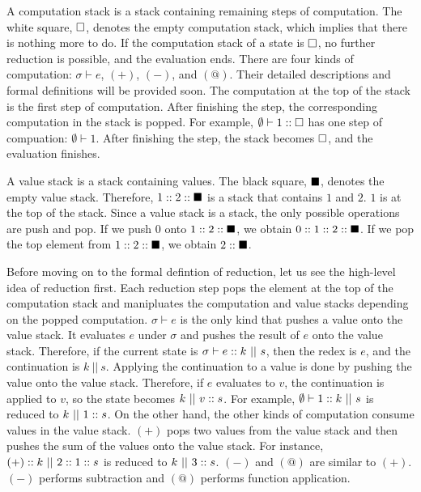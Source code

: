 A computation stack is a stack containing remaining steps of computation.
The white square, $\square$, denotes the empty computation stack, which
implies that there is nothing more to do. If the computation stack of a state is
$\square$, no further reduction is possible, and the evaluation ends.
There are four kinds of computation: $\sigma\vdash e$, $(+)$, $(-)$, and $(@)$.
Their detailed descriptions and formal definitions will be provided soon.
The computation at the top of the stack is the first step of computation. After
finishing the step, the corresponding computation in the stack is popped.
For example, $\emptyset\vdash1::\square$ has one step of compuation:
$\emptyset\vdash1$. After finishing the step, the stack becomes $\square$, and the
evaluation finishes.

A value stack is a stack containing values. The black square, $\blacksquare$, denotes the empty
value stack. Therefore, $1::2::\blacksquare$ is a stack that contains $1$
and $2$. $1$ is at the top of the stack. Since a value stack is a stack, the
only possible operations are push and pop. If we push $0$ onto
$1::2::\blacksquare$, we obtain $0::1::2::\blacksquare$.
If we pop the top element from $1::2::\blacksquare$, we obtain
$2::\blacksquare$.

Before moving on to the formal defintion of reduction, let us see the high-level
idea of reduction first.
Each reduction step pops the element at the top of the computation stack and
manipluates the computation and value stacks depending on the popped computation.
$\sigma\vdash e$ is the only kind that pushes a value onto the value stack.
It evaluates $e$ under $\sigma$ and pushes the result of $e$ onto the value stack.
Therefore, if the current state is $\sigma\vdash e::k\ ||\ s$, then the redex
is $e$, and the continuation is $k\ ||\ s$. Applying the continuation to a value is done by
pushing the value onto the value stack. Therefore, if $e$ evaluates to $v$, the
continuation is applied to $v$, so the state becomes $k\ ||\ \conss{v}s$.
For example, $\emptyset\vdash1::k\ ||\ s$ is reduced to $k\ ||\ 1::s$.
On the other hand, the other kinds of computation consume values in the value stack.
$(+)$ pops two values from the
value stack and then pushes the sum of the values onto the value stack.
For instance, $(+):: k\ ||\ 2::1::s$ is reduced to $k\ ||\ 3::s$.
$(-)$ and $(@)$ are similar to $(+)$. $(-)$ performs subtraction and $(@)$
performs function application.

